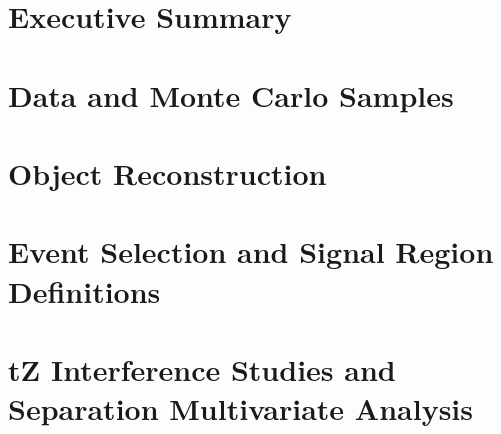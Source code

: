 \documentclass[NOTE, atlasdraft=true, texlive=2016, UKenglish]{\ATLASLATEXPATH atlasdoc}
\begin{document}
\clearpage

\section{Executive Summary}
\label{sec:summary}


%

\section{Data and Monte Carlo Samples}
\label{sec:data}


\section{Object Reconstruction}
\label{sec:obj}


\section{Event Selection and Signal Region Definitions}
\label{sec:evt_selection}


\section{tZ Interference Studies and Separation Multivariate Analysis}
\label{sec:tZ_bdt}

\end{document}
